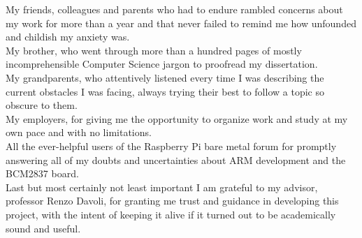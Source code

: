 \documentclass[12pt,a4paper,openright,twoside]{report}
\begin{document}
My friends, colleagues and parents who had to endure rambled concerns about
my work for more than a year and that never failed 
to remind me how unfounded and childish my anxiety was.\\

My brother, who went through more than a hundred pages of mostly incomprehensible
Computer Science jargon to proofread my dissertation.\\

My grandparents, who attentively listened every time I was describing the current
obstacles I was facing, always trying their best to follow a topic
so obscure to them.\\

My employers, for giving me the opportunity to organize work and study at my own
pace and with no limitations.\\

All the ever-helpful users of the Raspberry Pi bare metal forum for promptly 
answering all of my doubts and uncertainties about ARM development and the 
BCM2837 board.\\

Last but most certainly not least important I am grateful to my advisor, professor
Renzo Davoli, for granting me trust and guidance in developing this project, with
the intent of keeping it alive if it turned out to be academically sound and
useful.
\end{document}
